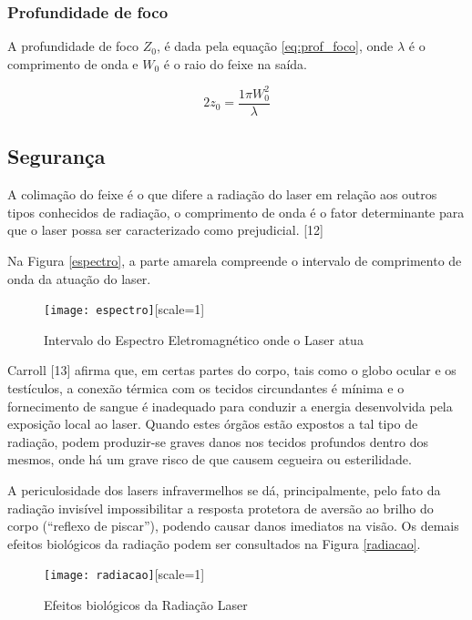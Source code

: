 \subsubsection{Profundidade de foco}

A profundidade de foco $Z_0$, é dada pela equação \ref{eq:prof_foco}, onde $\lambda$ é o comprimento de onda e $W_0$ é o raio do feixe na saída.

\begin{equation}
\label{eq:prof_foco}
2z_{0}=\frac{1 \pi W_0^2}{\lambda}
\end{equation}

\subsection{Segurança}

A colimação do feixe é o que difere a radiação do laser em relação aos outros tipos conhecidos de radiação, o comprimento de onda é o fator determinante para que o laser possa ser caracterizado como prejudicial. [12]

Na Figura \ref{espectro}, a parte amarela compreende o intervalo de comprimento de onda da atuação do laser.

\begin{figure}[ht!]
	\centering
	\caption{Intervalo do Espectro Eletromagnético onde o Laser atua}
	\label{fig:espectro}
	\texttt{[image: espectro]}[scale=1]
\end{figure}

Carroll [13] afirma que, em certas partes do corpo, tais como o globo ocular e os testículos, a conexão térmica com os tecidos circundantes é mínima e o fornecimento de sangue é inadequado para conduzir a energia desenvolvida pela exposição local ao laser. Quando estes órgãos estão expostos a tal tipo de radiação, podem produzir-se graves danos nos tecidos profundos dentro dos mesmos, onde há um grave risco de que causem cegueira ou esterilidade.

A periculosidade dos lasers infravermelhos se dá, principalmente, pelo fato da radiação invisível impossibilitar a resposta protetora de aversão ao brilho do corpo (``reflexo de piscar''), podendo causar danos imediatos na visão. Os demais efeitos biológicos da radiação podem ser consultados na Figura \ref{radiacao}.

\begin{figure}[ht!]
	\centering
	\caption{Efeitos biológicos da Radiação Laser}
	\label{fig:radiacao}
	\texttt{[image: radiacao]}[scale=1]
\end{figure}

